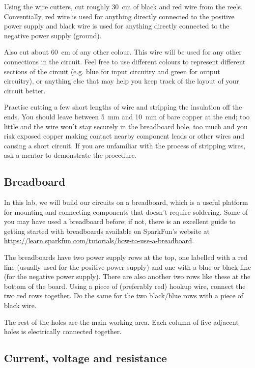 \documentclass{article}
\begin{document}
Using the wire cutters, cut roughly \SI{30}{\centi\metre} of black and red wire
from the reels. Conventially, red wire is used for anything directly connected
to the positive power supply and black wire is used for anything directly
connected to the negative power supply (ground).

Also cut about \SI{60}{\centi\metre} of any other colour. This wire will be used
for any other connections in the circuit. Feel free to use different colours to
represent different sections of the circuit (e.g. blue for input circuitry and
green for output circuitry), or anything else that may help you keep track of
the layout of your circuit better.

Practise cutting a few short lengths of wire and stripping the insulation off
the ends. You should leave between \SI{5}{\milli\metre} and
\SI{10}{\milli\metre} of bare copper at the end; too little and the wire won't
stay securely in the breadboard hole, too much and you risk exposed copper
making contact nearby component leads or other wires and causing a short
circuit. If you are unfamiliar with the process of stripping wires, ask a
mentor to demonstrate the procedure.

\subsection{Breadboard}

In this lab, we will build our circuits on a breadboard, which is a useful
platform for mounting and connecting components that doesn't require soldering.
Some of you may have used a breadboard before; if not, there is an excellent
guide to getting started with breadboards available on SparkFun's website at
\url{https://learn.sparkfun.com/tutorials/how-to-use-a-breadboard}.

The breadboards have two power supply rows at the top, one labelled with
a red line (usually used for the positive power supply) and one with a blue or
black line (for the negative power supply). There are also another two
rows like these at the bottom of the board. Using a piece of (preferably red)
hookup wire, connect the two red rows together. Do the same for the two
black/blue rows with a piece of black wire.

The rest of the holes are the main working area. Each column of five adjacent
holes is electrically connected together.

\subsection{Current, voltage and resistance}
\end{document}

